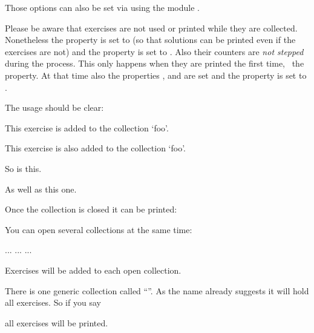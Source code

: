 \documentclass{xsim-manual}
\begin{document}
Those options can also be set via  using the module
.

\begin{bewareofthedog}
  Please be aware that exercises are not used or printed while they are
  collected.  Nonetheless the property  is set to 
  (so that solutions can be printed even if the exercises are not) and the
  property  is set to .  Also their counters are
  \emph{not stepped} during the process.  This only happens when they are
  printed the first time, \cf~the  property.  At that time
  also the properties ,  and
   are set and the property  is set to
  .
\end{bewareofthedog}

The usage should be clear:
\begin{example}
  \begin{exercise}
    This exercise is added to the collection `foo'.
  \end{exercise}
  \begin{exercise}
    This exercise is also added to the collection `foo'.
  \end{exercise}
  \begin{exercise}
    So is this.
  \end{exercise}
  \begin{exercise}
    As well as this one.
  \end{exercise}
\end{example}
Once the collection is closed it can be printed:
\begin{example}
\end{example}

You can open several collections at the same time:
\begin{sourcecode}
    ...
    ...
    ...
\end{sourcecode}
Exercises will be added to each open collection.

There is one generic collection called \enquote{}.  As the
name already suggests it will hold all exercises.  So if you say
\begin{sourcecode}
\end{sourcecode}
all exercises will be printed.
\end{document}
